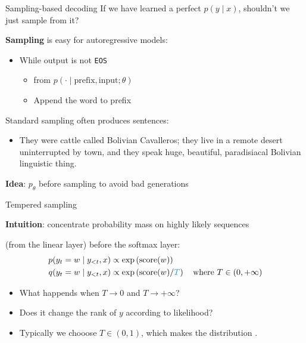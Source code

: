 \documentclass[usenames,dvipsnames,notes,11pt,aspectratio=169,hyperref={colorlinks=true, linkcolor=blue}]{beamer}
\begin{document}
\begin{frame}
    {Sampling-based decoding}
    If we have learned a perfect $p(y\mid x)$, shouldn't we just sample from it?
    \pause

    \textbf{Sampling} is easy for autoregressive models:\\
    \begin{itemize}
        \item While output is not \texttt{EOS}
            \begin{itemize}
                \item {} from $p(\cdot\mid \text{prefix}, \text{input};\theta)$
                \item Append the word to prefix
            \end{itemize}
    \end{itemize}

    \pause
    Standard sampling often produces  sentences:\\
    \begin{itemize}
        \item[] {\footnotesize They were cattle called Bolivian Cavalleros; they live in a remote desert uninterrupted by town, and they speak huge, beautiful, paradisiacal Bolivian linguistic thing.}
    \end{itemize}

    \textbf{Idea}:  $p_\theta$ before sampling to avoid bad generations 
\end{frame}

\begin{frame}
    {Tempered sampling}

    \textbf{Intuition}: concentrate probability mass on highly likely sequences 

     (from the linear layer) before the softmax layer:\\
    \begin{align*}
        p(y_t=w \mid y_{<t},x) &\propto \exp\p{\mathrm{score}(w)}\\
        q(y_t=w \mid y_{<t}, x) &\propto \exp\p{\mathrm{score}(w)/{\color{blue}T}} 
        \quad \text{where } T\in(0, +\infty)
    \end{align*}
    \pause
    \vspace{-2em}
    \begin{itemize}
        \item What happends when $T\to 0$ and $T\to +\infty$?
        \item Does it change the rank of $y$ according to likelihood?
        \item Typically we chooose $T\in (0, 1)$, which makes the distribution .
    \end{itemize}
\end{frame}
\end{document}
